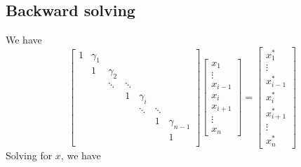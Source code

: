 \documentclass[landscape]{article}
\begin{document}

\subsection{Backward solving}
We have
\[
\left[\begin{array}{ccccccccc}
1     & \gamma_{1}  &           &           &              &           &             \\
      & 1           & \gamma_{2}            &              &           &             \\
      &             & \ddots    & \ddots    &              &           &             \\
      &             &           & 1         & \gamma_{i}   &           &             \\
      &             &           &           & \ddots       & \ddots    &             \\
      &             &           &           &              & 1         & \gamma_{n-1}\\
      &             &           &           &              &           & 1           \\
\end{array} \right] 
\left[ \begin{array}{c}
x_{1} \\ \vdots \\ x_{i-1} \\ x_{i} \\ x_{i+1} \\ \vdots \\ x_{n}
\end{array} \right]
=
\left[ \begin{array}{c}
x^*_{1} \\ \vdots \\ x^*_{i-1} \\ x^*_{i} \\ x^*_{i+1} \\ \vdots \\ x^*_{n}
\end{array} \right]
\]
Solving for $x$, we have
\end{document}
